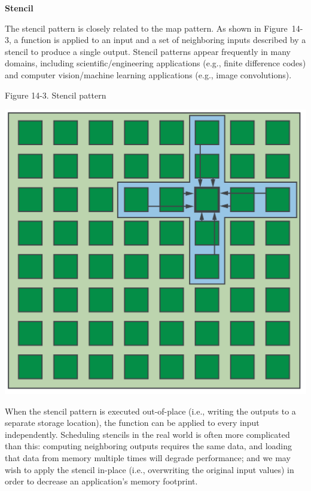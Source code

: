 \hspace*{\fill} \par %
\textbf{Stencil}

The stencil pattern is closely related to the map pattern. As shown in Figure 14-3, a function is applied to an input and a set of neighboring inputs described by a stencil to produce a single output. Stencil patterns appear frequently in many domains, including scientific/engineering applications (e.g., finite difference codes) and computer vision/machine learning applications (e.g., image convolutions).\par

\hspace*{\fill} \par %
Figure 14-3. Stencil pattern
\begin{center}
	\includegraphics[width=1.\textwidth]{content/chapter-14/images/3}
\end{center}

When the stencil pattern is executed out-of-place (i.e., writing the outputs to a separate storage location), the function can be applied to every input independently. Scheduling stencils in the real world is often more complicated than this: computing neighboring outputs requires the same data, and loading that data from memory multiple times will degrade performance; and we may wish to apply the stencil in-place (i.e., overwriting the original input values) in order to decrease an application’s memory footprint.\par

